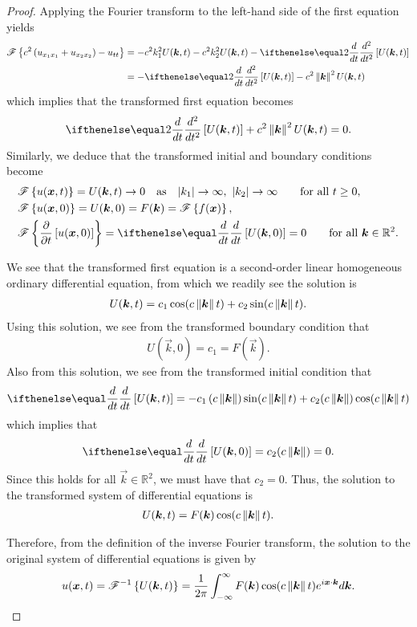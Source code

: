 \begin{proof}
  Applying the Fourier transform to the left-hand side of the first equation yields
  \begin{align*}
    \fourier{c^2\left(u_{x_1x_1} + u_{x_2x_2}\right) - u_{tt}}
    &= -c^2k_1^2 U(\vec{k}, t) -c^2k_2^2U(\vec{k}, t) - \der{t}{2}\left[U(\vec{k}, t)\right ]\\
    &= -\der{t}{2}\left[U(\vec{k}, t)\right ] -c^2\norm{\vec{k}}^2 U(\vec{k}, t)
  \end{align*}
  which implies that the transformed first equation becomes
  \begin{align*}
    \der{t}{2}\left[U(\vec{k}, t)\right ] +c^2\norm{\vec{k}}^2 U(\vec{k}, t) = 0.
  \end{align*}
  Similarly, we deduce that the transformed initial and boundary conditions become
  \begin{align*}
    &\fourier{u(\vec{x}, t)} = U(\vec{k}, t) \to 0 \quad \text{as} \quad |k_1| \to \infty,\ |k_2| \to \infty \qquad \text{for all $t\geq 0$},\\
    &\fourier{u(\vec{x}, 0)} = U(\vec{k}, 0) = F(\vec{k}) = \fourier{f(\vec{x})}, \\
    &\fourier{\frac{\partial}{\partial t}\left[u(\vec{x}, 0)\right]} = \der{t}{}\left[U(\vec{k}, 0)\right]= 0 \qquad \text{for all $\vec{k}\in\mathbb{R}^2$}.
  \end{align*}

  We see that the transformed first equation is a second-order linear homogeneous ordinary differential equation, from
  which we readily see the solution is
  \begin{align*}
    U(\boldsymbol{k}, t) = c_1 \cos(c\left\Vert {\boldsymbol{k}} \right\Vert t) + c_2\sin(c\left\Vert {\boldsymbol{k}} \right\Vert t).
  \end{align*}
  Using this solution, we see from the transformed boundary condition that
  \begin{align*}
    U(\vec{k}, 0) = c_1 = F(\vec{k}).
  \end{align*}
  Also from this solution, we see from the transformed initial condition that
  \begin{align*}
    \der{t}{}\left[U(\vec{k}, t)\right] = -c_1 \left(c\norm{\vec{k}}\right) \sin(c\norm{\vec{k}}t) + c_2 (c\norm{\vec{k}})\cos(c\norm{\vec{k}}t)
  \end{align*}
  which implies that
  \begin{align*}
    \der{t}{}\left[U(\vec{k}, 0)\right] = c_2 (c\norm{\vec{k}}) = 0.
  \end{align*}
  Since this holds for all $\vec{k}\in\mathbb{R}^2$, we must have that $c_2 = 0$.
  Thus, the solution to the transformed system of differential equations is
  \begin{align*}
    U(\boldsymbol{k}, t) = F(\boldsymbol{k}) \cos(c\left\Vert {\boldsymbol{k}} \right\Vert t).
  \end{align*}

  Therefore, from the definition of the inverse Fourier transform, the solution
  to the original system of differential equations is given by
  \begin{align*}
    u(\boldsymbol{x}, t) = \mathscr{F}^{-1}\left\{ {U(\boldsymbol{k}, t)} \right\} = \frac{1}{2\pi} \int_{-\infty}^\infty F(\boldsymbol{k}) \cos(c\left\Vert {\boldsymbol{k}} \right\Vert t) e^{i \boldsymbol{x} \cdot \boldsymbol{k}} d\boldsymbol{k}.
  \end{align*}
\end{proof}
\newpage
